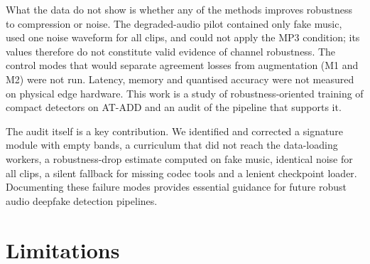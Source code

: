 What the data do not show is whether any of the methods improves robustness to compression or noise. The degraded-audio pilot contained only fake music, used one noise waveform for all clips, and could not apply the MP3 condition; its values therefore do not constitute valid evidence of channel robustness. The control modes that would separate agreement losses from augmentation (M1 and M2) were not run. Latency, memory and quantised accuracy were not measured on physical edge hardware. This work is a study of robustness-oriented training of compact detectors on AT-ADD and an audit of the pipeline that supports it.

The audit itself is a key contribution. We identified and corrected a signature module with empty bands, a curriculum that did not reach the data-loading workers, a robustness-drop estimate computed on fake music, identical noise for all clips, a silent fallback for missing codec tools and a lenient checkpoint loader. Documenting these failure modes provides essential guidance for future robust audio deepfake detection pipelines.

\section{Limitations}

